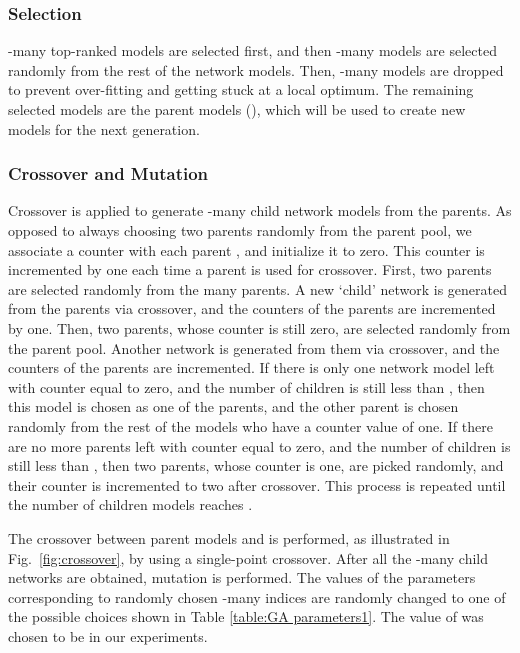 \documentclass[10pt,twocolumn,letterpaper]{article}
\begin{document}
\subsubsection{Selection} \vspace{-0.2cm}
-many top-ranked models are selected first, and then -many models are selected randomly from the rest of the network models. Then, -many models are dropped to prevent over-fitting and getting stuck at a local optimum. The remaining selected models are the parent models (), which will be used to create new models for the next generation.
\vspace{-0.4cm}
\subsubsection{Crossover and Mutation} \vspace{-0.2cm}
Crossover is applied to generate -many child network models from the parents. As opposed to always choosing two parents randomly from the parent pool, we associate a counter  with each parent , and initialize it to zero. This counter is incremented by one each time a parent is used for crossover. First, two parents are selected randomly from the  many parents. A new `child' network is generated from the parents via crossover, and the counters of the parents are incremented by one. Then, two parents, whose counter is still zero, are selected randomly from the parent pool. Another network is generated from them via crossover, and the counters of the parents are incremented. If there is only one network model left with counter equal to zero, and the number of children is still less than , then this model is chosen as one of the parents, and the other parent is chosen randomly from the rest of the models who have a counter value of one. If there are no more parents left with counter equal to zero, and the number of children is still less than , then two parents, whose counter is one, are picked randomly, and their counter is incremented to two after crossover. This process is repeated until the number of children models reaches .

The crossover between parent models  and  is performed, as illustrated in Fig.~\ref{fig:crossover}, by using a single-point crossover. After all the -many child networks are obtained, mutation is performed. The values of the parameters corresponding to randomly chosen -many indices are randomly changed to one of the possible choices shown in Table \ref{table:GA parameters1}. The value of  was chosen to be  in our experiments.
\end{document}

